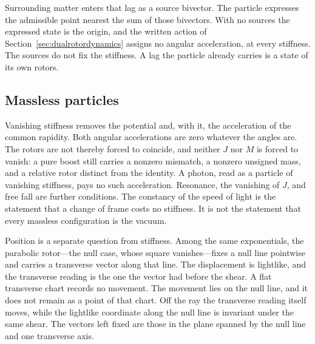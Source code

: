 \documentclass[a4paper]{article}
\begin{document}
Surrounding matter enters that lag as a source bivector. The particle expresses the admissible point nearest the sum of those bivectors. With no sources the expressed state is the origin, and the written action of Section~\ref{sec:dualrotordynamics} assigns no angular acceleration, at every stiffness. The sources do not fix the stiffness. A lag the particle already carries is a state of its own rotors.

\subsection{Massless particles}

Vanishing stiffness removes the potential and, with it, the acceleration of the common rapidity. Both angular accelerations are zero whatever the angles are. The rotors are not thereby forced to coincide, and neither $J$ nor $M$ is forced to vanish: a pure boost still carries a nonzero mismatch, a nonzero unsigned mass, and a relative rotor distinct from the identity. A photon, read as a particle of vanishing stiffness, pays no such acceleration. Resonance, the vanishing of $J$, and free fall are further conditions. The constancy of the speed of light is the statement that a change of frame costs no stiffness. It is not the statement that every massless configuration is the vacuum.

Position is a separate question from stiffness. Among the same exponentials, the parabolic rotor---the null case, whose square vanishes---fixes a null line pointwise and carries a transverse vector along that line. The displacement is lightlike, and the transverse reading is the one the vector had before the shear. A flat transverse chart records no movement. The movement lies on the null line, and it does not remain as a point of that chart. Off the ray the transverse reading itself moves, while the lightlike coordinate along the null line is invariant under the same shear. The vectors left fixed are those in the plane spanned by the null line and one transverse axis.
\end{document}
